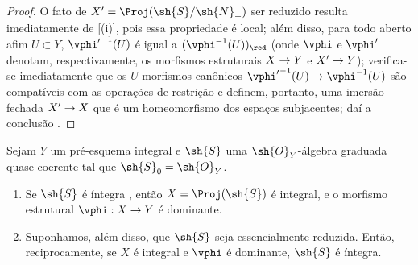 \documentclass[oneside,10pt]{amsart}
\makeatletter
\newcommand{\ega@arrow}[2]{\mathchoice{#1}{#2}{#2}{#2}}
\renewcommand{\to}{\ega@arrow{\longrightarrow}{\rightarrow}}
\let\EGAOriginalLabel\label
\renewcommand{\label}[1]{\phantomsection\EGAOriginalLabel{#1}}
\makeatother
\begin{document}
\begin{proof}
O fato de $X'=\Proj(\sh{S}/\sh{N}_+)$ ser reduzido resulta imediatamente de [(i)], pois essa propriedade é local;
além disso, para todo aberto afim $U\subset Y$, ${\vphi'}^{-1}(U)$ é igual a $(\vphi^{-1}(U))_\red$ (onde $\vphi$ e $\vphi'$ denotam, respectivamente, os morfismos estruturais $X\to Y$ e $X'\to Y$);
verifica-se imediatamente que os $U$-morfismos canônicos ${\vphi'}^{-1}(U)\to\vphi^{-1}(U)$ são compatíveis com as operações de restrição e definem, portanto, uma imersão fechada $X'\to X$ que é um homeomorfismo dos espaços subjacentes;
daí a conclusão .
\end{proof}

\begin{proposition}[3.1.14]
\label{II.3.1.14}
Sejam $Y$ um pré-esquema integral e $\sh{S}$ uma $\sh{O}_Y$-álgebra graduada quase-coerente tal que $\sh{S}_0=\sh{O}_Y$.
\begin{enumerate}
  \item[(i)] Se $\sh{S}$ é íntegra , então $X=\Proj(\sh{S})$ é integral, e o morfismo estrutural $\vphi:X\to Y$ é dominante.
  \item[(ii)] Suponhamos, além disso, que $\sh{S}$ seja essencialmente reduzida.
    Então, reciprocamente, se $X$ é integral e $\vphi$ é dominante, $\sh{S}$ é íntegra.
\end{enumerate}
\end{proposition}
\end{document}
